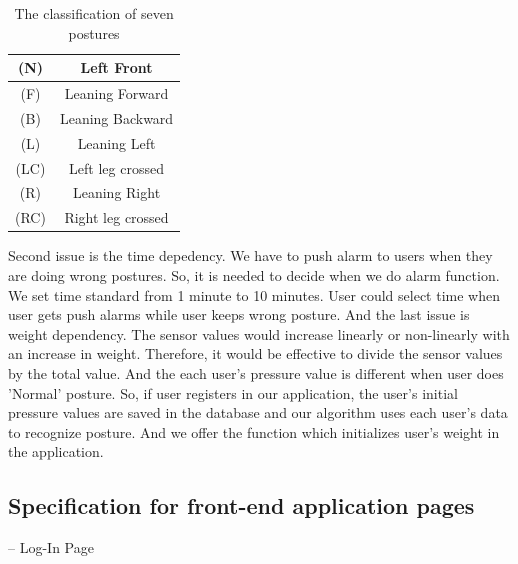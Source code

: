 \documentclass[conference]{IEEEtran}
\begin{document}
 \begin{table}[h]
{\renewcommand\arraystretch{1.25}
\caption{The classification of seven postures}
\begin{tabular}{|c|cc}  \hline\hline
(N)& \multicolumn{2}{p{7cm}|}{\raggedright Left Front} \\ \hline
(F)& \multicolumn{2}{p{7cm}|}{\raggedright Leaning Forward} \\ \hline
(B)& \multicolumn{2}{p{7cm}|}{\raggedright Leaning Backward} \\ \hline
(L)& \multicolumn{2}{p{7cm}|}{\raggedright Leaning Left} \\ \hline
(LC)& \multicolumn{2}{p{7cm}|}{\raggedright Left leg crossed} \\ \hline 
(R)& \multicolumn{2}{p{7cm}|}{\raggedright Leaning Right} \\ \hline
(RC)& \multicolumn{2}{p{7cm}|}{\raggedright Right leg crossed} \\ \hline \hline
\end{tabular}}
\end{table}



Second issue is the time depedency. We have to push alarm to users when they are doing wrong postures. So, it is needed to decide when we do alarm function. We set time standard from 1 minute to 10 minutes. User could select time when user gets push alarms while user keeps wrong posture. 
   And the last issue is weight dependency. The sensor values would increase linearly or non-linearly with an increase in weight. Therefore, it would be effective to divide the sensor values by the total value. And the each user's pressure value is different when user does 'Normal' posture. So, if user registers in our application, the user's initial pressure values are saved in the database and our algorithm uses each user's data to recognize posture. And we offer the function which initializes user's weight in the application. 

\subsection{Specification for front-end application pages\\}



 --	Log-In Page\\
\end{document}
